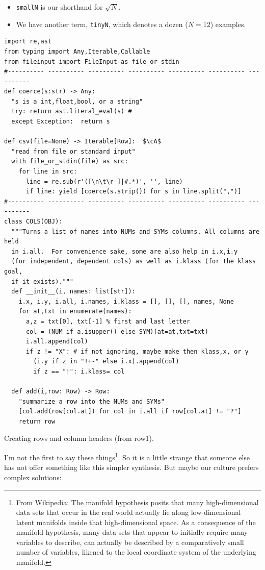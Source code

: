 \documentclass[landscape,	DIV=calc,%
							paper=letter,%
							fontsize=10pt,%
							twocolumn]{scrartcl}	 					%
\newcommand*\circled[1]{\tikz[baseline=(char.base)]{
            \node[minimum width=1pt, shape=circle,fill=black,inner sep=1pt] (char) {{\footnotesize \textcolor{white}{#1}}};}}
\newcommand{\cA}{\circled{a}}
\begin{document}
\begin{itemize}
    \item
 \verb+smallN+ is our shorthand for   $\sqrt{N}$.
\item We have another term,  \verb+tinyN+, which  denotes a dozen  ($N=12$) examples.  
\end{itemize}



\begin{table}[!t]
    \begin{lstlisting}
import re,ast
from typing import Any,Iterable,Callable
from fileinput import FileInput as file_or_stdin
#---------- ---------- ---------- ---------- ---------- ---------- ----------
def coerce(s:str) -> Any:
  "s is a int,float,bool, or a string"
  try: return ast.literal_eval(s) # 
  except Exception:  return s

def csv(file=None) -> Iterable[Row]:  $\cA$
  "read from file or standard input"
  with file_or_stdin(file) as src: 
    for line in src:
      line = re.sub(r'([\n\t\r ]|#.*)', '', line)
      if line: yield [coerce(s.strip()) for s in line.split(",")]
#---------- ---------- ---------- ---------- ---------- ---------- ----------
class COLS(OBJ): 
  """Turns a list of names into NUMs and SYMs columns. All columns are held 
  in i.all.  For convenience sake, some are also help in i.x,i.y 
  (for independent, dependent cols) as well as i.klass (for the klass goal, 
  if it exists)."""
  def __init__(i, names: list[str]): 
    i.x, i.y, i.all, i.names, i.klass = [], [], [], names, None
    for at,txt in enumerate(names):
      a,z = txt[0], txt[-1] % first and last letter
      col = (NUM if a.isupper() else SYM)(at=at,txt=txt)
      i.all.append(col)
      if z != "X": # if not ignoring, maybe make then klass,x, or y
        (i.y if z in "!+-" else i.x).append(col)
        if z == "!": i.klass= col

  def add(i,row: Row) -> Row: 
    "summarize a row into the NUMs and SYMs"
    [col.add(row[col.at]) for col in i.all if row[col.at] != "?"]
    return row
\end{lstlisting}
    \caption{Creating rows and column headers (from row1).}\label{read}
\end{table}

I'm not the first to say these things\footnote{
From Wikipedia: The manifold hypothesis posits that many
high-dimensional data sets that occur in the real world actually
lie along low-dimensional latent manifolds inside that high-dimensional
space. As a consequence of the manifold hypothesis, many data sets
that appear to initially require many variables to describe, can
actually be described by a comparatively small number of variables,
likened to the local coordinate system of the underlying manifold.}.
So it is a little
strange that someone else has not offer something like this simpler
synthesis. But maybe our culture prefers complex solutions:
\end{document}
